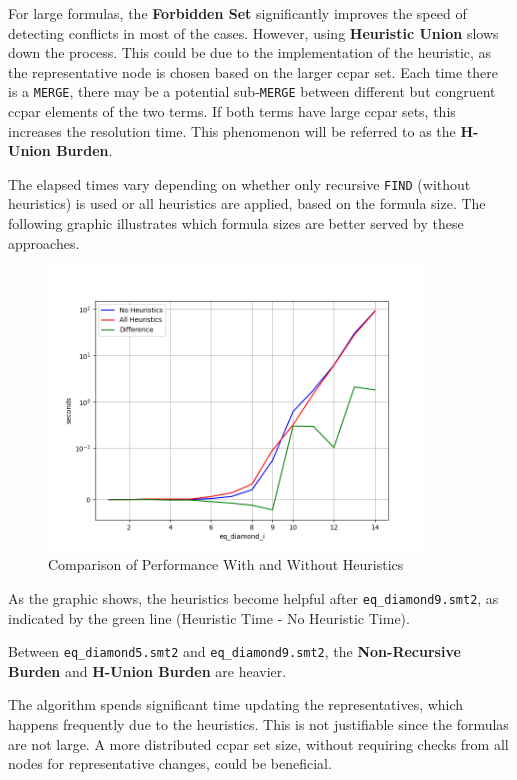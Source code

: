 \documentclass[11pt,a4paper]{article}
\begin{document}
    For large formulas, the \textbf{Forbidden Set} significantly improves the speed of detecting conflicts in most of the cases. However, using \textbf{Heuristic Union} slows down the process. This could be due to the implementation of the heuristic, as the representative node is chosen based on the larger ccpar set. Each time there is a \texttt{MERGE}, there may be a potential sub-\texttt{MERGE} between different but congruent ccpar elements of the two terms. If both terms have large ccpar sets, this increases the resolution time. This phenomenon will be referred to as the \textbf{H-Union Burden}.

    The elapsed times vary depending on whether only recursive \texttt{FIND} (without heuristics) is used or all heuristics are applied, based on the formula size. The following graphic illustrates which formula sizes are better served by these approaches.

    \begin{figure}[H]
        \centering
        \includegraphics[width=10cm]{graphic.png}
        \caption{Comparison of Performance With and Without Heuristics}
        \label{fig:graphic}
    \end{figure}

    As the graphic shows, the heuristics become helpful after \texttt{eq\_diamond9.smt2}, as indicated by the green line (Heuristic Time - No Heuristic Time).

    Between \texttt{eq\_diamond5.smt2} and \texttt{eq\_diamond9.smt2}, the \textbf{Non-Recursive Burden} and \textbf{H-Union Burden} are heavier. 

    The algorithm spends significant time updating the representatives, which happens frequently due to the heuristics. This is not justifiable since the formulas are not large. A more distributed ccpar set size, without requiring checks from all nodes for representative changes, could be beneficial.
\end{document}
